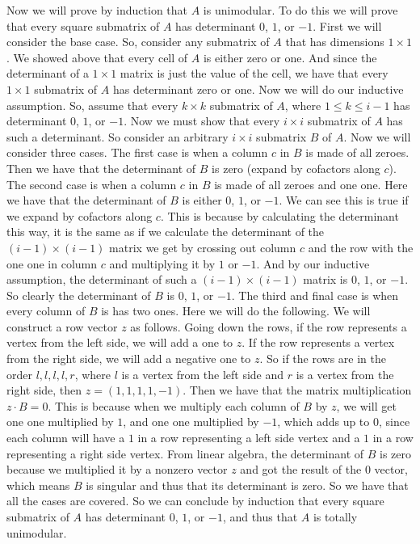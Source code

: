 \documentclass{article}
\begin{document}
\begin{description}
        Now we will prove by induction that $A$ is unimodular. To do this we
        will prove that every square submatrix of $A$ has determinant $0$, $1$,
        or $-1$.
        First we will consider the base case. So, consider any submatrix of $A$
        that has dimensions $1 \times 1$. We showed above that every cell of $A$
        is either zero or one. And since the determinant of a $1 \times 1$
        matrix is just the value of the cell, we have that every $1 \times 1$
        submatrix of $A$ has determinant zero or one. Now we will do our inductive
        assumption. So, assume that every $k \times k$ submatrix of
        $A$, where $1 \le k \le i - 1$ has determinant $0$, $1$, or $-1$.
        Now we must show that every $i \times i$ submatrix of
        $A$ has such a determinant. So consider an arbitrary $i \times i$
        submatrix $B$ of $A$.
        Now we will consider three cases. The first case is when a column $c$ in
        $B$ is made of all
        zeroes. Then we have that the determinant of $B$ is zero (expand by
        cofactors along $c$). The second case is when a
        column $c$ in $B$ is made of
        all zeroes and one one. Here we have that the determinant of $B$ is either $0$, $1$,
        or $-1$. We can see this is true if we expand by cofactors along $c$.
        This is because by calculating the determinant this way, it is the same
        as if we calculate the determinant of the $(i - 1) \times (i - 1)$
        matrix we get by crossing out column $c$ and the row with the one one in
        column $c$ and multiplying it by $1$ or $-1$. And by our inductive
        assumption, the determinant of such a $(i - 1) \times (i - 1)$ matrix is
        $0$, $1$, or $-1$. So clearly the determinant of $B$ is $0$, $1$, or
        $-1$. The third and final case
        is when every column of $B$ is has two ones. Here we will do the
        following. We will construct a row vector $z$ as follows. Going down the
        rows, if the row represents a vertex from the left side, we will add
        a one to $z$. If the row represents a vertex from the right side, we
        will add a negative one to $z$. So if the rows are in the order $l, l,
        l, l, r$, where $l$ is a vertex from the left side and $r$ is a vertex
        from the right side, then $z = (1, 1, 1, 1, -1)$. Then we have that the
        matrix multiplication $z \cdot B = 0$. This is because when
        we multiply each column of $B$ by
        $z$, we will get one one multiplied by $1$, and one one multiplied by
        $-1$, which adds up to $0$, since each column will have a $1$ in a row
        representing a left side vertex and a $1$ in a row representing a right
        side vertex. From linear algebra, the determinant of $B$
        is zero because we multiplied it by a nonzero vector $z$ and got the
        result of the $0$ vector, which means $B$ is singular and thus that its determinant
        is zero. So we have that all the cases are covered. So we can
        conclude by induction that every square submatrix of $A$ has determinant
        $0$, $1$, or $-1$, and thus that $A$ is totally unimodular.
\end{description}
\newpage
\end{document}
